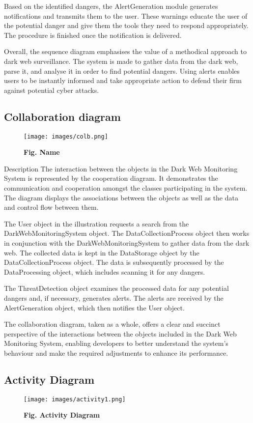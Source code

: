\documentclass[10pt]{report}
\begin{document}
Based on the identified dangers, the AlertGeneration module generates notifications and transmits them to the user. These warnings educate the user of the potential danger and give them the tools they need to respond appropriately. The procedure is finished once the notification is delivered.

Overall, the sequence diagram emphasises the value of a methodical approach to dark web surveillance. The system is made to gather data from the dark web, parse it, and analyse it in order to find potential dangers. Using alerts enables users to be instantly informed and take appropriate action to defend their firm against potential cyber attacks.

\subsection{Collaboration diagram}
\begin{figure}[H]
 \centering
 \texttt{[image: images/colb.png]}
 \caption{\textbf{Fig. Name}}
\end{figure}
Description
The interaction between the objects in the Dark Web Monitoring System is represented by the cooperation diagram. It demonstrates the communication and cooperation amongst the classes participating in the system. The diagram displays the associations between the objects as well as the data and control flow between them.

The User object in the illustration requests a search from the DarkWebMonitoringSystem object. The DataCollectionProcess object then works in conjunction with the DarkWebMonitoringSystem to gather data from the dark web. The collected data is kept in the DataStorage object by the DataCollectionProcess object. The data is subsequently processed by the DataProcessing object, which includes scanning it for any dangers.

The ThreatDetection object examines the processed data for any potential dangers and, if necessary, generates alerts. The alerts are received by the AlertGeneration object, which then notifies the User object.

The collaboration diagram, taken as a whole, offers a clear and succinct perspective of the interactions between the objects included in the Dark Web Monitoring System, enabling developers to better understand the system's behaviour and make the required adjustments to enhance its performance.

\subsection{Activity Diagram}
\begin{figure}[H]
 \centering
 \texttt{[image: images/activity1.png]}
 \caption{\textbf{Fig. Activity Diagram}}
\end{figure}
\end{document}
